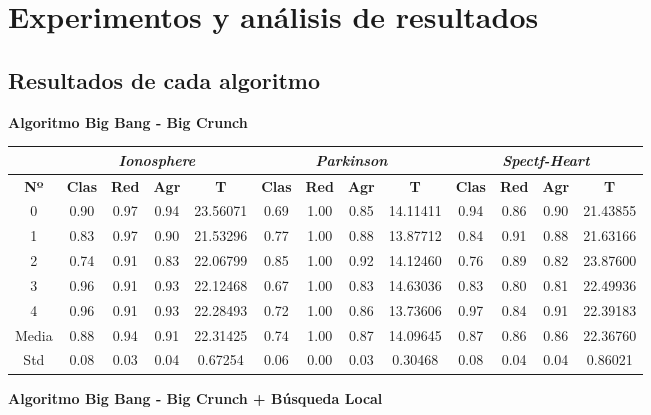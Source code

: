 \documentclass[10pt, a4paper]{article}
\theoremstyle{theorem-style}
\theoremstyle{theorem-style}
\theoremstyle{theorem2-style}
\theoremstyle{definition-style}
\theoremstyle{remark-style}
\theoremstyle{example-style}
\theoremstyle{definition-style}
\theoremstyle{remark-style}
\theoremstyle{remark-style}
\begin{document}
\section{Experimentos y análisis de resultados}

\subsection{Resultados de cada algoritmo}

\textbf{Algoritmo Big Bang - Big Crunch}

\begin{table}[ht!]
\begin{tabular}{ccccc|cccc|cccc}
\centering
 & \multicolumn{4}{c}{\textit{Ionosphere}} & \multicolumn{4}{c}{\textit{Parkinson}} & \multicolumn{4}{c}{\textit{Spectf-Heart}} \\ \hline
\textbf{Nº} & \textbf{Clas} & \textbf{Red} & \textbf{Agr} & \textbf{T} & \textbf{Clas} & \textbf{Red} & \textbf{Agr} & \textbf{T} & \textbf{Clas} & \textbf{Red} & \textbf{Agr} & \textbf{T} \\ \hline
0&	 0.90 & 0.97 & 0.94 & 23.56071 & 	0.69 & 1.00 & 0.85 & 14.11411 & 0.94 & 0.86 & 0.90 & 21.43855 \\ 
1&	 0.83 & 0.97 & 0.90 & 21.53296 & 	0.77 & 1.00 & 0.88 & 13.87712 & 0.84 & 0.91 & 0.88 & 21.63166 \\ 
2&	 0.74 & 0.91 & 0.83 & 22.06799 & 	0.85 & 1.00 & 0.92 & 14.12460 & 0.76 & 0.89 & 0.82 & 23.87600 \\ 
3&	 0.96 & 0.91 & 0.93 & 22.12468 & 	0.67 & 1.00 & 0.83 & 14.63036 & 0.83 & 0.80 & 0.81 & 22.49936 \\ 
4&	 0.96 & 0.91 & 0.93 & 22.28493 & 	0.72 & 1.00 & 0.86 & 13.73606 & 0.97 & 0.84 & 0.91 & 22.39183 \\ 
\hline
Media&	 0.88 & 0.94 & 0.91 & 22.31425 &	0.74 & 1.00 & 0.87 & 14.09645 &		0.87 & 0.86 & 0.86 & 22.36760
 \\ Std&	 0.08 & 0.03 & 0.04 & 0.67254 &	0.06 & 0.00 & 0.03 & 0.30468	&	0.08 & 0.04 & 0.04 & 0.86021
 \\
\end{tabular}
\end{table}

\textbf{Algoritmo Big Bang - Big Crunch + Búsqueda Local}
\end{document}
